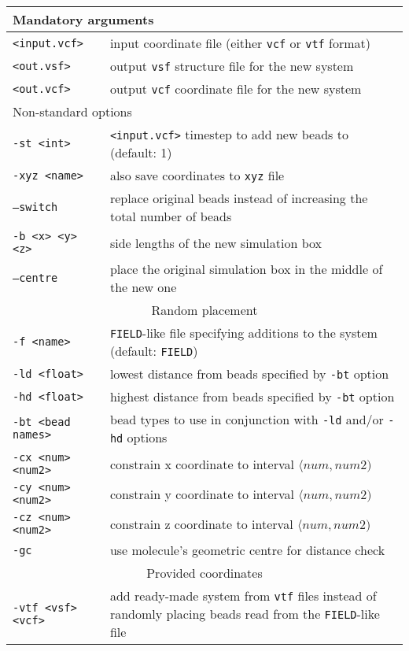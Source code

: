 \vspace{1em}
\noindent
\begin{longtable}{p{}p{}}
  \toprule
  \multicolumn{2}{l}{Mandatory arguments} \\
  \midrule
  \texttt{<input.vcf>} & input coordinate file (either \texttt{vcf} or
    \texttt{vtf} format) \\
  \texttt{<out.vsf>} & output \texttt{vsf} structure file for the new
    system \\
  \texttt{<out.vcf>} & output \texttt{vcf} coordinate file for the new
    system \\
  \toprule
  \multicolumn{2}{l}{Non-standard options} \\
  \midrule
  \texttt{-st <int>} & \texttt{<input.vcf>} timestep to add new beads
    to (default: 1) \\
  \texttt{-xyz <name>} & also save coordinates to \texttt{xyz} file \\
  \texttt{--switch} & replace original beads instead of increasing the
    total number of beads \\
  \texttt{-b <x> <y> <z>} & side lengths of the new simulation box \\
  \texttt{--centre} & place the original simulation box in the middle of
    the new one \\
  \midrule
  \multicolumn{2}{c}{Random placement} \\
  \midrule
  \texttt{-f <name>} & \texttt{FIELD}-like file specifying additions to the
    system (default: \texttt{FIELD}) \\
  \texttt{-ld <float>} & lowest distance from beads specified by
    \texttt{-bt} option \\
  \texttt{-hd <float>} & highest distance from beads specified by
    \texttt{-bt} option \\
  \texttt{-bt <bead names>} & bead types to use in conjunction with
    \texttt{-ld} and/or \texttt{-hd} options \\
  \texttt{-cx <num> <num2>} & constrain x coordinate to interval
    $\langle num, num2)$ \\
  \texttt{-cy <num> <num2>} & constrain y coordinate to interval
    $\langle num, num2)$ \\
  \texttt{-cz <num> <num2>} & constrain z coordinate to interval
    $\langle num, num2)$ \\
  \texttt{-gc} & use molecule's geometric centre for distance check \\
  \midrule
  \multicolumn{2}{c}{Provided coordinates} \\
  \midrule
  \texttt{-vtf <vsf> <vcf>} & add ready-made system from \texttt{vtf} files
    instead of randomly placing beads read from the \texttt{FIELD}-like file \\
  \bottomrule
\end{longtable}
